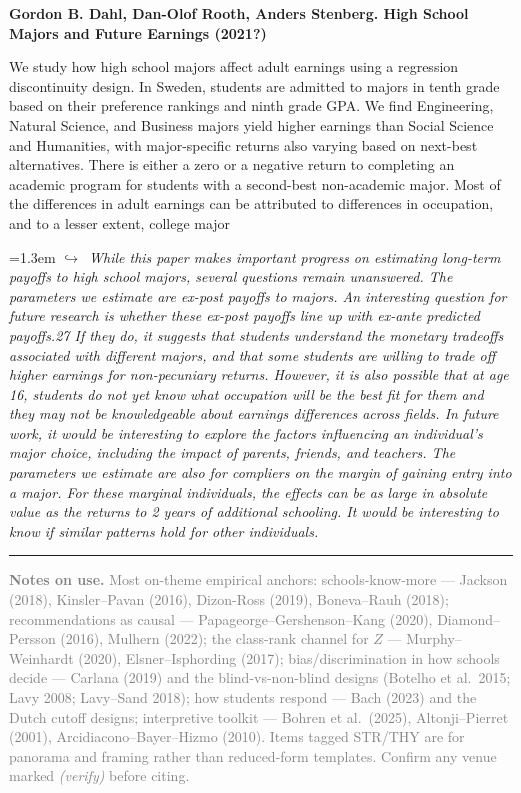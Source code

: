 \documentclass[11pt]{article}
\newcommand{\entry}[3]{%
  \par\medskip\noindent\textbf{#1}\par
  \nopagebreak #2\hspace{0.35em}{\small\color{tagcol}[#3]}\par}
\newcommand{\note}[1]{\par\smallskip\noindent\hangindent=1.3em
  \textcolor{notecol}{\footnotesize$\hookrightarrow$~\textit{#1}}}
\begin{document}
\entry{Gordon B. Dahl, Dan-Olof Rooth, Anders Stenberg. High School Majors and Future Earnings (2021?)}
{We study how high school majors affect adult earnings using a regression discontinuity design. In Sweden, students are admitted to majors in tenth grade based on their
preference rankings and ninth grade GPA. We find Engineering, Natural Science, and Business
majors yield higher earnings than Social Science and Humanities, with major-specific returns
also varying based on next-best alternatives. There is either a zero or a negative return to
completing an academic program for students with a second-best non-academic major. Most
of the differences in adult earnings can be attributed to differences in occupation, and to a
lesser extent, college major}{REV}
\note{While this paper makes important progress on estimating long-term payoffs to high school
majors, several questions remain unanswered. The parameters we estimate are ex-post payoffs
to majors. An interesting question for future research is whether these ex-post payoffs line
up with ex-ante predicted payoffs.27 If they do, it suggests that students understand the
monetary tradeoffs associated with different majors, and that some students are willing to
trade off higher earnings for non-pecuniary returns. However, it is also possible that at
age 16, students do not yet know what occupation will be the best fit for them and they
may not be knowledgeable about earnings differences across fields. In future work, it would
be interesting to explore the factors influencing an individual’s major choice, including the
impact of parents, friends, and teachers. The parameters we estimate are also for compliers
on the margin of gaining entry into a major. For these marginal individuals, the effects can
be as large in absolute value as the returns to 2 years of additional schooling. It would be
interesting to know if similar patterns hold for other individuals.
}



\vspace{6pt}
\hrule
\vspace{6pt}
\noindent\textcolor{grey}{\small \textbf{Notes on use.} Most on-theme empirical anchors:
schools-know-more --- Jackson (2018), Kinsler--Pavan (2016), Dizon-Ross (2019), Boneva--Rauh
(2018); recommendations as causal --- Papageorge--Gershenson--Kang (2020), Diamond--Persson
(2016), Mulhern (2022); the class-rank channel for $Z$ --- Murphy--Weinhardt (2020),
Elsner--Isphording (2017); bias/discrimination in how schools decide --- Carlana (2019) and
the blind-vs-non-blind designs (Botelho et al.\ 2015; Lavy 2008; Lavy--Sand 2018); how
students respond --- Bach (2023) and the Dutch cutoff designs; interpretive toolkit ---
Bohren et al.\ (2025), Altonji--Pierret (2001), Arcidiacono--Bayer--Hizmo (2010). Items
tagged STR/THY are for panorama and framing rather than reduced-form templates. Confirm any
venue marked \emph{(verify)} before citing.}
\end{document}
